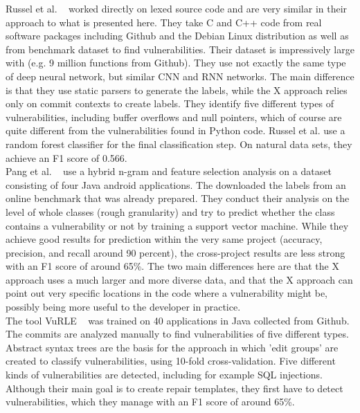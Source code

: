 \documentclass[
a4paper,
pagesize,
pdftex,
12pt,
twoside, %
BCOR=5mm, %
ngerman,
fleqn,
final,
]{scrartcl}
\begin{document}
	
	Russel et al. ~\cite{Russell.2018} worked directly on lexed source code and are very similar in their approach to what is presented here. They take C and C++ code from real software packages including Github and the Debian Linux distribution as well as from benchmark dataset to find vulnerabilities. Their dataset is impressively large with (e.g. 9 million functions from Github). They use not exactly the same type of deep neural network, but similar CNN and RNN networks. The main difference is that they use static parsers to generate the labels, while the X approach relies only on commit contexts to create labels. They identify five different types of vulnerabilities, including buffer overflows and null pointers, which of course are quite different from the vulnerabilities found in Python code. Russel et al. use a random forest classifier for the final classification step. On natural data sets, they achieve an F1 score of 0.566.\\
	
	Pang et al. ~\cite{Pang.2015} use a hybrid n-gram and feature selection analysis on a dataset consisting of four Java android applications. The downloaded the labels from an online benchmark that was already prepared. They conduct their analysis on the level of whole classes (rough granularity) and try to predict whether the class contains a vulnerability or not by training a support vector machine. While they achieve good results for prediction within the very same project (accuracy, precision, and recall around 90 percent), the cross-project results are less strong with an F1 score of around 65\%. The two main differences here are that the X approach uses a much larger and more diverse data, and that the X approach can point out very specific locations in the code where a vulnerability might be, possibly being more useful to the developer in practice.\\
	
	The tool VuRLE ~\cite{Ma.2017} was trained on 40 applications in Java collected from Github. The commits are analyzed manually to find vulnerabilities of five different types. Abstract syntax trees are the basis for the approach in which 'edit groups' are created to classify vulnerabilities, using 10-fold cross-validation. Five different kinds of vulnerabilities are detected, including for example SQL injections. Although their main goal is to create repair templates, they first have to detect vulnerabilities, which they manage with an F1 score of around 65\%. \\
	
\end{document}
